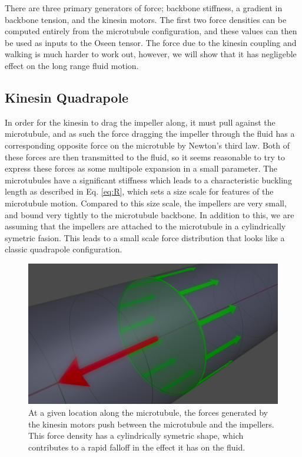 \documentclass[11pt]{ucthesis}
\begin{document}
{There are three primary generators of force; backbone stiffness, a gradient in backbone tension, and the kinesin motors. The first two force densities can be computed entirely from the microtubule configuration, and these values can then be used as inputs to the Oseen tensor.
The force due to the kinesin coupling and walking is much harder to work out, however, we will show that it has negligeble effect on the long range fluid motion.

\subsection{Kinesin Quadrapole}
In order for the kinesin to drag the impeller along, it must pull against the microtubule, and as such the force dragging the impeller through the fluid has a corresponding opposite force on the microtuble by Newton's third law. 
Both of these forces are then transmitted to the fluid, so it seems reasonable to try to express these forces as some multipole expansion in a small parameter.
The microtubules have a significant stiffness which leads to a characteristic buckling length as described in Eq. \ref{eq:R}, which sets a size scale for features of the microtubule motion. Compared to this size scale, the impellers are very small, and bound very tightly to the microtubule backbone. 
In addition to this, we are assuming that the impellers are attached to the microtubule in a cylindrically symetric fasion. This leads to a small scale force distribution that looks like a classic quadrapole configuration.

\begin{figure}[htp]
\begin{center}
\includegraphics[width=\hsize]{segforce.png}
\caption{ 
At a given location along the microtubule, the forces generated by the kinesin motors push between the microtubule and the impellers. This force density has a cylindrically symetric shape, which contributes to a rapid falloff in the effect it has on the fluid.
}
\label{fig:quadforce}
\end{center}
\end{figure}

}
\end{document}
